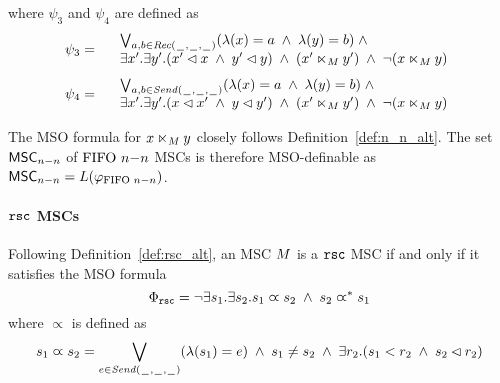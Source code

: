 \noindent where $\psi_3$ and $\psi_4$ are defined as 
\[
	\psi_3 =
	\begin{array}{rl}
		& \bigvee_{\substack{a,b \in {\mathit{Rec}(\hspace{0.1em}\underline{\hspace{0.5em}}\hspace{0.1em},\hspace{0.1em}\underline{\hspace{0.5em}}\hspace{0.1em},\hspace{0.1em}\underline{\hspace{0.5em}}\hspace{0.1em})}}}
		  (\lambda(x) = a \;\wedge\; \lambda(y) = b)
		  \;\wedge\; \\
		& \exists x'.\exists y'.(x' \lhd x \;\wedge\; y' \lhd y) \;\wedge\; (x' \ltimes_M y') \;\wedge\; \neg(x \ltimes_M y)\\
	\end{array}
\]
\[
	\psi_4 =
	\begin{array}{rl}
		& \bigvee_{\substack{a,b \in {\mathit{Send}(\hspace{0.1em}\underline{\hspace{0.5em}}\hspace{0.1em},\hspace{0.1em}\underline{\hspace{0.5em}}\hspace{0.1em},\hspace{0.1em}\underline{\hspace{0.5em}}\hspace{0.1em})}}}
		  (\lambda(x) = a \;\wedge\; \lambda(y) = b)
		  \;\wedge\; \\
		& \exists x'.\exists y'.(x \lhd x' \;\wedge\; y \lhd y') \;\wedge\; (x' \ltimes_M y') \;\wedge\; \neg(x \ltimes_M y)\\
	\end{array}
\]

The MSO formula for $x \ltimes_M y$ closely follows Definition~\ref{def:n_n_alt}. The set $\mathsf{MSC}_{n\mathsf{-}n}$ of $\text{FIFO } n\mathsf{-}n$ MSCs is therefore MSO-definable as $\mathsf{MSC}_{n\mathsf{-}n}=L(\varphi_{\text{FIFO } n\mathsf{-}n})$.

\paragraph*{$\mathtt{rsc}$ MSCs}

Following Definition~\ref{def:rsc_alt}, an MSC $M$ is a $\mathtt{rsc}$ MSC if and only if it satisfies the MSO formula
\[
\Phi_{\mathtt{rsc}} = \neg \exists s_1.\exists s_2. s_1 \varpropto s_2 \;\wedge\; s_2 \varpropto^\ast s_1
\]
\noindent where $\varpropto$ is defined as
\[
s_1 \varpropto s_2 = 
\bigvee_{\substack{e \in {\mathit{Send}(\hspace{0.1em}\underline{\hspace{0.5em}}\hspace{0.1em},\hspace{0.1em}\underline{\hspace{0.5em}}\hspace{0.1em},\hspace{0.1em}\underline{\hspace{0.5em}}\hspace{0.1em})}}}(\lambda(s_1) = e) \;\wedge\;
s_1 \neq s_2 \;\wedge\; 
\exists r_2. (s_1 < r_2 \;\wedge\; s_2 \lhd r_2)
\]
